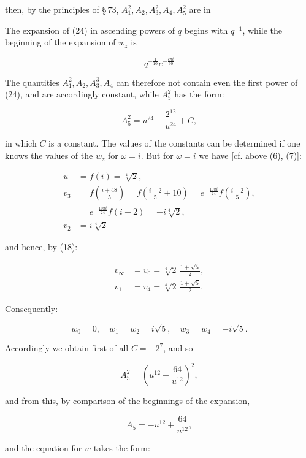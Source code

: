 then, by the principles of §\,73, $A_1^2, A_2, A_3^2, A_4, A_5^2$ are
 in


The expansion of (24) in ascending powers of $q$ begins with
$q^{-1}$, while the beginning of the expansion of $w_z$ is

\[
q^{-\frac{1}{10}}e^{-\frac{c\pi i}{60}}
\]

The quantities $A_1^2, A_2, A_3^3, A_4$ can %
 therefore not contain even
the first power of (24), and are accordingly constant, while $A_5^2$
has the form:

\[
A_5^2 = u^{24} + \frac{2^{12}}{u^{24}} + C,
\]

in which $C$ is a constant. The values of the constants can be
determined if one knows the values of the $w_z$ for $\omega = i$. But
for $\omega = i$ we have [cf. above (6), (7)]:

\[
\begin{aligned}
u &= f(i) = \sqrt[4]{2},\\
v_3 &= f\left(\frac{i+48}{5}\right) = f\left(\frac{i-2}{5}+10\right) = e^{-\frac{10\pi i}{24}}f\left(\frac{i-2}{5}\right),\\
&= e^{-\frac{10\pi i}{24}}f(i+2) = -i\sqrt[4]{2},\\
v_2 &= i\sqrt[4]{2}
\end{aligned}
\]

and hence, by (18):

\[
\begin{aligned}
v_\infty &= v_0 = \sqrt[4]{2}\,\frac{1+\sqrt{5}}{2},\\
v_1 &= v_4 = \sqrt[4]{2}\,\frac{1+\sqrt{5}}{2}. %
\end{aligned}
\]

Consequently:

\[
w_0 = 0, \quad w_1 = w_2 = i\sqrt{5}, \quad w_3 = w_4 = -i\sqrt{5}.
\]

Accordingly we obtain first of all $C = -2^7$, and so

\[
A_5^2 = \left(u^{12} - \frac{64}{u^{12}}\right)^2,
\]

and from this, by comparison of the beginnings of the expansion,

\[
A_5 = -u^{12} + \frac{64}{u^{12}},
\]

and the equation for $w$ takes the form:

